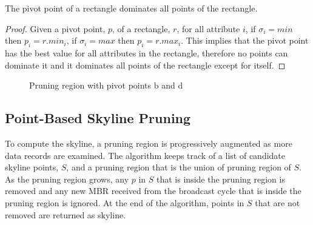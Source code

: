 \begin{corollary}\label{co:pivot_point}
The pivot point of a rectangle dominates all points of the rectangle.
\end{corollary}

\begin{proof}
Given a pivot point, $p$, of a rectangle, $r$, for all attribute $i$,
if $\sigma_i = min$ then $p_i = r.min_i$, if $\sigma_i = max$ then
$p_i = r.max_i$. This implies that the pivot point has the best value
for all attributes in the rectangle, therefore no points can dominate it
and it dominates all points of the rectangle except for itself.
\end{proof}

\begin{figure}[!h]
\label{fig:rtree_pr}
\centering
{}
\caption{Pruning region with pivot points b and d}
\end{figure}


\subsection{Point-Based Skyline Pruning}

To compute the skyline, a pruning region is progressively
augmented as more data records are examined. The algorithm keeps
track of a list of candidate skyline points, $S$, and a pruning
region that is the union of pruning region of $S$. As the pruning
region grows, any $p$ in $S$ that is inside the pruning region is
removed and any new MBR received from the broadcast cycle that is
inside the pruning region is ignored. At the end of the algorithm,
points in $S$ that are not removed are returned as skyline.


